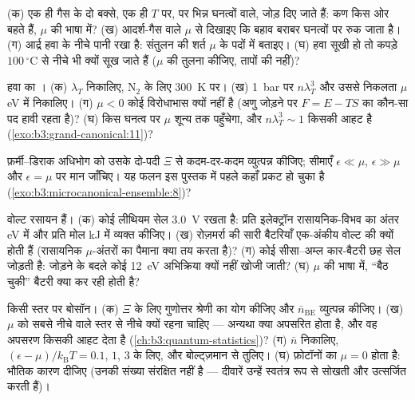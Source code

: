 \begin{exercise}[$\star$]\label{exo:b3:grand-canonical:1}
(क) एक ही गैस के दो बक्से, एक ही $T$ पर, पर भिन्न घनत्वों वाले, जोड़
दिए जाते हैं: कण किस ओर बहते हैं,
$\mu$ की भाषा में? (ख) आदर्श-गैस वाले $\mu$ से दिखाइए कि बहाव
बराबर घनत्वों पर रुक जाता है। (ग) आर्द्र हवा के नीचे पानी रखा है:
संतुलन की शर्त $\mu$ के पदों में बताइए। (घ) हवा सूखी हो तो कपड़े
$100\,^\circ$C से नीचे भी क्यों सूख जाते हैं ($\mu$ की तुलना कीजिए,
तापों की नहीं)?
\end{exercise}

\begin{exercise}[$\star$]\label{exo:b3:grand-canonical:2}
हवा का । (क) $\lambda_T$ निकालिए, N$_2$ के लिए
\qty{300}{K} पर। (ख) \qty{1}{bar} पर $n\lambda_T^3$ और उससे निकलता
$\mu$ eV में निकालिए। (ग) $\mu < 0$ कोई विरोधाभास क्यों नहीं है
(अणु जोड़ने पर $F = E - TS$ का कौन-सा पद हावी रहता है)? (घ)
किस घनत्व पर $\mu$ शून्य तक पहुँचेगा, और
$n\lambda_T^3 \sim 1$ किसकी आहट है
(\cref{exo:b3:grand-canonical:11})?
\end{exercise}

\begin{exercise}[$\star$]\label{exo:b3:grand-canonical:3}
फ़र्मी--डिराक अधिभोग को उसके दो-पदी $\Xi$ से
कदम-दर-कदम व्युत्पन्न कीजिए; सीमाएँ $\epsilon \ll \mu$, $\epsilon \gg
\mu$ और $\epsilon = \mu$ पर मान जाँचिए। यह फलन इस पुस्तक में
पहले कहाँ प्रकट हो चुका है
(\cref{exo:b3:microcanonical-ensemble:8})?
\end{exercise}

\begin{exercise}[$\star$]\label{exo:b3:grand-canonical:4}
वोल्ट रसायन हैं। (क) कोई लीथियम सेल \qty{3.0}{V} रखता है:
प्रति इलेक्ट्रॉन रासायनिक-विभव का अंतर eV में और प्रति मोल kJ में
व्यक्त कीजिए। (ख) रोज़मर्रा की सारी बैटरियाँ एक-अंकीय
वोल्ट की क्यों होती हैं (रासायनिक $\mu$-अंतरों का पैमाना क्या तय
करता है)? (ग) कोई सीसा--अम्ल कार-बैटरी छह सेल जोड़ती है: जोड़ने के
बदले कोई \qty{12}{eV} अभिक्रिया क्यों नहीं खोजी जाती? (घ) $\mu$ की
भाषा में, ``बैठ चुकी'' बैटरी क्या कर रही होती है?
\end{exercise}

\begin{exercise}[$\star\star$]\label{exo:b3:grand-canonical:5}
किसी स्तर पर बोसॉन। (क) $\Xi$ के लिए गुणोत्तर श्रेणी का योग कीजिए और
$\bar n_{\text{BE}}$ व्युत्पन्न कीजिए। (ख) $\mu$ को सबसे नीचे वाले
स्तर से नीचे क्यों रहना चाहिए --- अन्यथा क्या अपसरित होता है, और वह
अपसरण किसकी आहट देता है (\cref{ch:b3:quantum-statistics})? (ग)
$\bar n$ निकालिए, $(\epsilon - \mu)/k_{\text{B}}T = 0.1$, $1$,
$3$ के लिए, और बोल्ट्ज़मान से तुलिए। (घ) फ़ोटॉनों का $\mu = 0$ होता है:
भौतिक कारण दीजिए (उनकी संख्या संरक्षित नहीं है --- दीवारें उन्हें
स्वतंत्र रूप से सोखती और उत्सर्जित करती हैं)।
\end{exercise}

